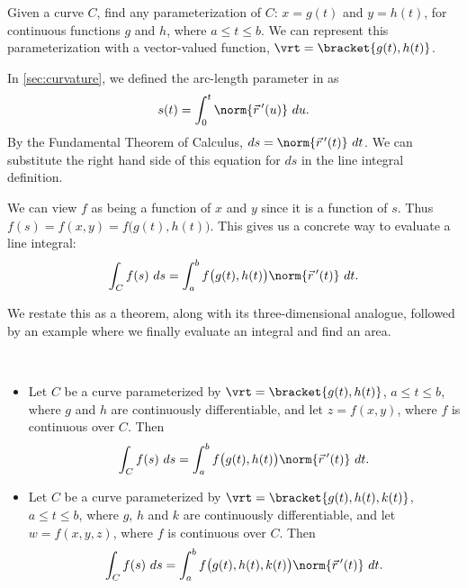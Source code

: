 
Given a curve $C$, find any parameterization of $C$: $x = g(t)$ and $y=h(t)$, for continuous functions $g$ and $h$, where $a\leq t\leq b$. We can represent this parameterization with a vector-valued function, $\vrt =\bracket{g(t),h(t)}$.

In \autoref{sec:curvature}, we defined the arc-length parameter in  as 
\[
s(t) = \int_0^t \norm{\vec r\,'(u)}\ du. 
\]
By the Fundamental Theorem of Calculus, $ds = \norm{\vec r\,'(t)}\ dt$. We can substitute the right hand side of this equation for $ds$ in the line integral definition.

We can view $f$ as being a function of $x$ and $y$ since it is a function of $s$. Thus $f(s) =f(x,y) =f\big(g(t),h(t)\big)$. This gives us a concrete way to evaluate a line integral:
\[\int_C f(s)\ ds = \int_a^bf\big(g(t),h(t)\big)\norm{\vec r\,'(t)}\ dt.\]

We restate this as a theorem, along with its three-dimensional analogue, followed by an example where we finally evaluate an integral and find an area.

{%
\mbox{}\\[-2\baselineskip]\begin{itemize}
	\item Let $C$ be a curve parameterized by $\vrt =\bracket{g(t),h(t)}$, $a\leq t\leq b$, where $g$ and $h$ are continuously differentiable, and let $z=f(x,y)$, where $f$ is continuous over $C$. Then
\[\int_Cf(s)\ ds = \int_a^bf\big(g(t),h(t)\big)\norm{\vec r\,'(t)}\ dt.\]
	\item Let $C$ be a curve parameterized by $\vrt =\bracket{g(t),h(t),k(t)}$, $a\leq t\leq b$, where $g$, $h$ and $k$ are continuously differentiable, and let $w=f(x,y,z)$, where $f$ is continuous over $C$. Then
\[\int_Cf(s)\ ds = \int_a^bf\big(g(t),h(t),k(t)\big)\norm{\vec r\,'(t)}\ dt.\]
\end{itemize}}


